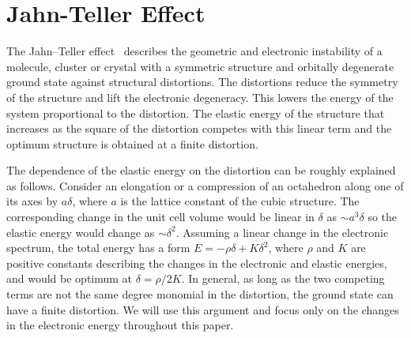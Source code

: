 \documentclass[a4paper,prb,twocolumn]{revtex4-1}  %
\newcommand{\com}[1]{}
\newcommand{\az}[1]{{\color{magenta}{#1}}} %
\begin{document}
\com{
$V_{oct}(\vec r)$ causes the d-orbitals to split into two manifolds,
$t_{2g}$  and $e_g$, where $t_{2g}$ contains three degenerate states ($xy,yz,zx$) while $e_g$ has two degenerate states ($x^2-y^2,z^2$).
The crystal field splitting between the two manifolds is
${\Delta=\frac{160}{3}\frac{q_o}{a} D_{4}}$.
\az{We will see how these degeneracies are lifted as we elongate (or compress)
the octahedron along a ....??}
}


\section{Jahn-Teller Effect}
\label{sec:JT}



The Jahn--Teller 
effect~\cite{JahnPRSL37,JahnPRSL38,
OpikRS57,
Sturge68,
GehringRPP75,
BersukerCCR75,
KugelSPU82,
MillisN98,
LufasoAC04,
TerakuraPMS07,
HalcrowRSC13,
PavariniChap,
KhomskiiCR21}
 describes the 
geometric and electronic instability of a %
molecule, cluster or crystal with
a symmetric structure and orbitally degenerate ground state
against structural distortions.
The distortions  
reduce the symmetry of the structure
and lift the electronic degeneracy.
This lowers the energy of the system proportional to
the distortion.
The elastic energy of the structure that increases as the square of the distortion
competes with this linear term and the optimum structure 
is obtained at a finite distortion.


The dependence of the elastic energy on the distortion can be roughly explained
as follows.
Consider an 
elongation or a compression of an octahedron along one of its axes by $a\delta$,
where $a$ is the lattice constant of the cubic structure.
The corresponding change in the unit cell volume would be linear in $\delta$
as $\sim a^3 \delta$
so the elastic energy
would change as $\sim\delta^2$.
Assuming a linear change 
 in the electronic spectrum,
  the total energy has a form
$E=-\rho\delta + K \delta^2$, where $\rho$ and $K$ are positive constants 
describing the changes in the electronic and elastic energies,
and would be optimum at $\delta=\rho/2K$.
In general, as long as the two competing terms 
are not the same degree monomial in the distortion,
the ground state can have a finite distortion.
We will use this argument and focus only on the changes
 in the electronic energy throughout this paper.
\end{document}
